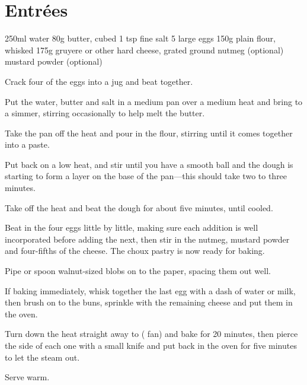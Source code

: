 \chapter{Entr\'ees}
\minitoc




\begin{ingreds}
	250ml water
    80g butter, cubed
    1 tsp fine salt
    5 large eggs
    150g plain flour, whisked
    175g gruyere or other hard cheese, grated
    ground nutmeg (optional)
    mustard powder (optional)
\end{ingreds}

\begin{method}
    Crack four of the eggs into a jug and beat together.

    Put the water, butter and salt in a medium pan over a medium heat and bring to a simmer,
    stirring occasionally to help melt the butter.

    Take the pan off the heat and pour in the flour, stirring until it comes together into a paste. 
    
    Put back on a low heat, and stir until you have a smooth ball and the dough is starting to form 
    a layer on the base of the pan---this should take two to three minutes.

    Take off the heat and beat the dough for about five minutes, until cooled.

    Beat in the four eggs little by little, making sure each addition is well incorporated 
    before adding the next, then stir in the nutmeg, mustard powder and four-fifths of the 
    cheese.  The choux pastry is now ready for baking.

    Pipe or spoon walnut-sized blobs on to the paper, spacing them out well.

    If baking immediately, whisk together the last egg with a dash of water or milk, then brush 
    on to the buns, sprinkle with the remaining cheese and put them in the oven.

    Turn down the heat straight away to  ( fan) and bake for 20 minutes, 
    then pierce the side of each one with a small knife and put back in the oven for five minutes 
    to let the steam out.

    Serve warm.
\end{method}


